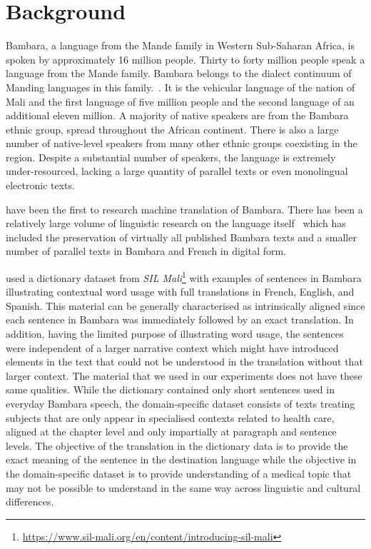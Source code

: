 \documentclass[11pt,a4paper]{article}
\begin{document}
\section{Background}

Bambara, a language from the Mande family in Western Sub-Saharan Africa, is spoken by approximately 16 million people. Thirty to forty million people speak a language from the Mande family. Bambara belongs to the dialect continuum of Manding languages in this family.~\cite{lewis2014ethnologue}.
It is the vehicular language of the nation of Mali and the first language of five million people and the second language of an additional eleven million. A majority of native speakers are from the Bambara ethnic group, spread throughout the African continent. There is also a large number of native-level speakers from many other ethnic groups coexisting in the region. Despite a substantial number of speakers, the language is extremely under-resourced, lacking a large quantity of parallel texts or even monolingual electronic texts. 

\citet{leventhal2020assessing, tapo-etal-2020-neural, luger2020towards} have been the first to research machine translation of Bambara. There has been a relatively large volume of linguistic research on the language itself~\citep{culy1985complexity,aplonova2017towards, aplonova2018development} which has included the preservation of virtually all published Bambara texts and a smaller number of parallel texts in Bambara and French in digital form.

\citet{tapo-etal-2020-neural} used a dictionary dataset from \emph{SIL Mali}\footnote{\url{https://www.sil-mali.org/en/content/introducing-sil-mali}} with examples of sentences in Bambara illustrating contextual word usage with full translations in French, English, and Spanish. This material can be generally characterised as intrinsically aligned since each sentence in Bambara was immediately followed by an exact translation. In addition, having the limited purpose of illustrating word usage, the sentences were independent of a larger narrative context which might have introduced elements in the text that could not be understood in the translation without that larger context. The material that we used in our experiments does not have these same qualities. While the dictionary contained only short sentences used in everyday Bambara speech, the domain-specific dataset consists of texts treating subjects that are only appear in specialised contexts related to health care, aligned at the chapter level and only impartially at paragraph and sentence levels. The objective of the translation in the dictionary data is to provide the exact meaning of the sentence in the destination language while the objective in the domain-specific dataset is to provide understanding of a medical topic that may not be possible to understand in the same way across linguistic and cultural differences.
\end{document}
